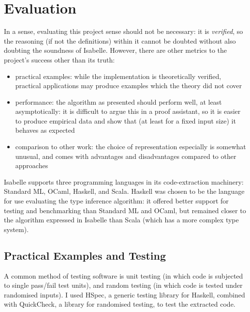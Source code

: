 \chapter{Evaluation}
In a sense, evaluating this project sense should not be necessary: it is \emph{verified}, so the reasoning (if not the definitions) within it cannot be doubted without also doubting the soundness of Isabelle.
However, there are other metrics to the project's success other than its truth:
\begin{itemize}
\item practical examples: while the implementation is theoretically verified, practical applications may produce examples which the theory did not cover
\item performance: the algorithm as presented should perform well, at least asymptotically: it is difficult to argue this in a proof assistant, so it is easier to produce empirical data and show that (at least for a fixed input size) it behaves as expected
\item comparison to other work: the choice of representation especially is somewhat unusual, and comes with advantages and disadvantages compared to other approaches
\end{itemize}

Isabelle supports three programming languages in its code-extraction machinery: Standard ML, OCaml, Haskell, and Scala\cite{codegen-reference}.
Haskell was chosen to be the language for use evaluating the type inference algorithm: it offered better support for testing and benchmarking than Standard ML and OCaml, but remained closer to the algorithm expressed in Isabelle than Scala (which has a more complex type system).

\section{Practical Examples and Testing}
A common method of testing software is unit testing (in which code is subjected to single pass/fail test units), and random testing (in which code is tested under randomised inputs).
I used HSpec\cite{hspec}, a generic testing library for Haskell, combined with QuickCheck\cite{quickcheck}, a library for randomised testing, to test the extracted code.

